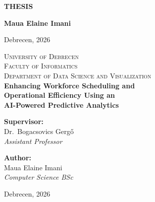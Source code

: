 \documentclass[12pt,a4paper,oneside]{article}
\begin{document}
\begin{titlepage}
\thispagestyle{empty}
\null\vfill
\begin{center}
{\fontsize{18}{24}\selectfont\bfseries THESIS}
\end{center}
\vfill
\hfill
\begin{minipage}[t]{0.4\textwidth}
\raggedleft
\textbf{Maua Elaine Imani}
\end{minipage}
\vfill\vfill
\begin{center}{\large Debrecen, 2026}\end{center}
\vspace{1cm}
\end{titlepage}

\newpage

\begin{titlepage}
\thispagestyle{empty}
\begin{center}
{\Large\scshape University of Debrecen}\\[0.3cm]
{\large\scshape Faculty of Informatics}\\[0.2cm]
{\scshape Department of Data Science and Visualization}\\[1.8cm]
{\fontsize{16}{20}\selectfont\bfseries
Enhancing Workforce Scheduling and\\[0.3cm]
Operational Efficiency Using an\\[0.3cm]
AI-Powered Predictive Analytics}
\end{center}
\vspace{6.8cm}
\begin{minipage}[t]{0.48\textwidth}
\begin{flushleft}
\textbf{Supervisor:}\\[0.2cm]
Dr.~Bogacsovics Gerg\H{o}\\
\textit{Assistant Professor}
\end{flushleft}
\end{minipage}
\hfill
\begin{minipage}[t]{0.48\textwidth}
\begin{flushright}
\textbf{Author:}\\[0.2cm]
Maua Elaine Imani\\
\textit{Computer Science BSc}
\end{flushright}
\end{minipage}
\vspace{1.8cm}

\begin{center}
\end{center}

\vfill

\begin{center}
{\large Debrecen, 2026}
\end{center}

\end{titlepage}
\end{document}
